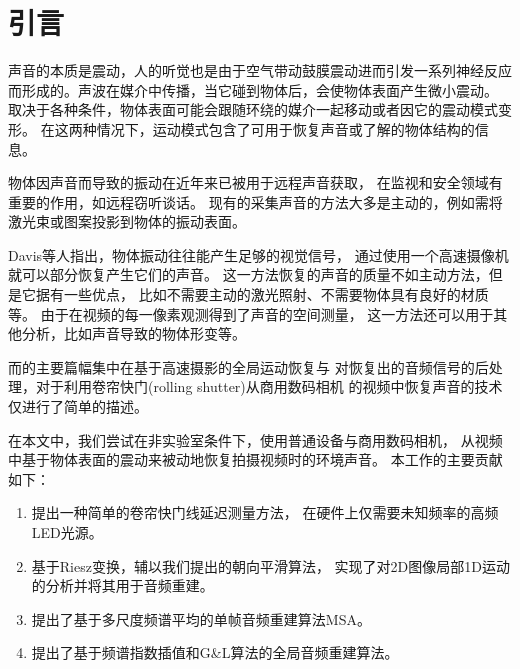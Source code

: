 
\section{引言}
声音的本质是震动，人的听觉也是由于空气带动鼓膜震动进而引发一系列神经反应
而形成的。声波在媒介中传播，当它碰到物体后，会使物体表面产生微小震动。
取决于各种条件，物体表面可能会跟随环绕的媒介一起移动或者因它的震动模式变形。
在这两种情况下，运动模式包含了可用于恢复声音或了解的物体结构的信息。

物体因声音而导致的振动在近年来已被用于远程声音获取，
在监视和安全领域有重要的作用，如远程窃听谈话。
现有的采集声音的方法大多是主动的，例如需将激光束或图案投影到物体的振动表面。

Davis等人指出\cite{Davis2014VisualMic}，物体振动往往能产生足够的视觉信号，
通过使用一个高速摄像机就可以部分恢复产生它们的声音。 
这一方法恢复的声音的质量不如主动方法，但是它据有一些优点，
比如不需要主动的激光照射、不需要物体具有良好的材质等。
由于在视频的每一像素观测得到了声音的空间测量，
这一方法还可以用于其他分析，比如声音导致的物体形变等。

而\cite{Davis2014VisualMic}的主要篇幅集中在基于高速摄影的全局运动恢复与
对恢复出的音频信号的后处理，对于利用卷帘快门(rolling shutter)从商用数码相机
的视频中恢复声音的技术仅进行了简单的描述。

在本文中，我们尝试在非实验室条件下，使用普通设备与商用数码相机，
从视频中基于物体表面的震动来被动地恢复拍摄视频时的环境声音。
本工作的主要贡献如下：
\begin{enumerate}
    \item 提出一种简单的卷帘快门线延迟测量方法，
        在硬件上仅需要未知频率的高频LED光源。
    \item 基于Riesz变换，辅以我们提出的朝向平滑算法，
        实现了对2D图像局部1D运动的分析并将其用于音频重建。
    \item 提出了基于多尺度频谱平均的单帧音频重建算法MSA。
    \item 提出了基于频谱指数插值和G\&L算法的全局音频重建算法。
\end{enumerate}



